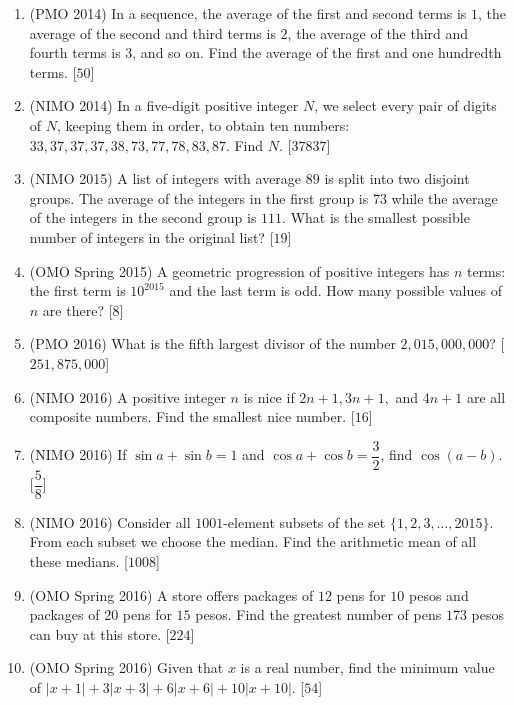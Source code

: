 \documentclass[11pt,paper=letter]{scrartcl}
\begin{document}
\begin{enumerate}
\item (PMO 2014) In a sequence, the average of the first and second terms is $1$, the average of the second and third terms is $2$, the average of the third and fourth terms is $3$, and so on. Find the average of the first and one hundredth terms. \hfill [$50$]

\item (NIMO 2014) In a five-digit positive integer $N$, we select every pair of digits of $N$, keeping them in order, to obtain ten numbers: $33, 37, 37, 37, 38, 73, 77, 78, 83, 87$. Find $N$. \hfill [$37837$]

\item (NIMO 2015) A list of integers with average $89$ is split into two disjoint groups. The average of the integers in the first group is $73$ while the average of the integers in the second group is $111$. What is the smallest possible number of integers in the original list? \hfill [$19$]

\item (OMO Spring 2015) A geometric progression of positive integers has $n$ terms: the first term is $10^{2015}$ and the last term is odd. How many possible values of $n$ are there? \hfill [$8$]

\item (PMO 2016) What is the fifth largest divisor of the number $2,015,000,000$? \hfill [$251,875,000$]

\item (NIMO 2016) A positive integer $n$ is nice if $2n + 1, 3n + 1,$ and $4n + 1$ are all composite numbers. Find the smallest nice number. \hfill [$16$]

\item (NIMO 2016) If $\sin a + \sin b = 1$ and $\cos a + \cos b = \dfrac{3}{2}$, find $\cos (a - b)$. \hfill [$\dfrac{5}{8}$]

\item (NIMO 2016) Consider all $1001$-element subsets of the set $\{1, 2, 3, \ldots, 2015\}$. From each subset we choose the median. Find the arithmetic mean of all these medians. \hfill [$1008$]

\item (OMO Spring 2016) A store offers packages of $12$ pens for $10$ pesos and packages of $20$ pens for $15$ pesos. Find the greatest number of pens $173$ pesos can buy at this store. \hfill [$224$]

\item (OMO Spring 2016) Given that $x$ is a real number, find the minimum value of $|x+1| + 3|x+3| + 6|x+6| + 10|x+10|$. \hfill [$54$]

\end{enumerate}
\end{document}
